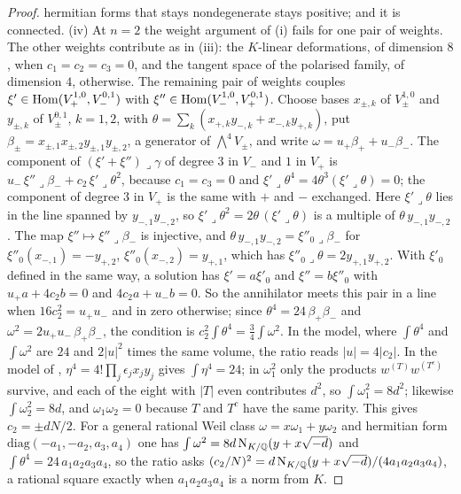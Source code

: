 \begin{proof}
hermitian forms that stays nondegenerate stays positive; and it is
connected. (iv) At $n=2$ the weight argument of
(i) fails for one pair of weights. The other weights
contribute as in (iii): the $K$-linear deformations, of dimension $8$, when
$c_{1}=c_{2}=c_{3}=0$, and the tangent space of the polarised family, of
dimension $4$, otherwise. The remaining pair of weights couples
$\xi'\in\operatorname{Hom}(V_{+}^{1,0},V_{-}^{0,1})$ with
$\xi''\in\operatorname{Hom}(V_{-}^{1,0},V_{+}^{0,1})$. Choose bases $x_{\pm,k}$ of
$V_{\pm}^{1,0}$ and $y_{\pm,k}$ of $V_{\pm}^{0,1}$, $k=1,2$, with
$\theta=\sum_{k}(x_{+,k}y_{-,k}+x_{-,k}y_{+,k})$, put
$\beta_{\pm}=x_{\pm,1}x_{\pm,2}y_{\pm,1}y_{\pm,2}$, a generator of
$\bigwedge^{4}V_{\pm}$, and write $\omega=u_{+}\beta_{+}+u_{-}\beta_{-}$. The component of
$(\xi'+\xi'')\lrcorner\gamma$ of degree $3$ in $V_{-}$ and $1$ in $V_{+}$ is
$u_{-}\,\xi''\lrcorner\beta_{-}+c_{2}\,\xi'\lrcorner\theta^{2}$, because
$c_{1}=c_{3}=0$ and $\xi'\lrcorner\theta^{4}=4\theta^{3}(\xi'\lrcorner\theta)=0$;
the component of degree $3$ in $V_{+}$ is the same with $+$ and $-$
exchanged.
Here $\xi'\lrcorner\theta$ lies in the line spanned by $y_{-,1}y_{-,2}$, so
$\xi'\lrcorner\theta^{2}=2\theta\,(\xi'\lrcorner\theta)$ is a multiple of
$\theta\,y_{-,1}y_{-,2}$. The map $\xi''\mapsto\xi''\lrcorner\beta_{-}$ is
injective, and $\theta\,y_{-,1}y_{-,2}=\xi''_{0}\lrcorner\beta_{-}$ for
$\xi''_{0}(x_{-,1})=-y_{+,2}$, $\xi''_{0}(x_{-,2})=y_{+,1}$, which has
$\xi''_{0}\lrcorner\theta=2y_{+,1}y_{+,2}$. With $\xi'_{0}$ defined in the
same way, a solution has $\xi'=a\xi'_{0}$ and $\xi''=b\xi''_{0}$ with
$u_{+}a+4c_{2}b=0$ and $4c_{2}a+u_{-}b=0$. So the annihilator meets this
pair in a line when $16c_{2}^{2}=u_{+}u_{-}$ and in zero otherwise; since
$\theta^{4}=24\,\beta_{+}\beta_{-}$ and
$\omega^{2}=2u_{+}u_{-}\,\beta_{+}\beta_{-}$, the condition is
$c_{2}^{2}\int\theta^{4}=\frac34\int\omega^{2}$.
In the model, where $\int\theta^{4}$ and $\int\omega^{2}$ are $24$ and
$2|u|^{2}$ times the same volume, the ratio reads $|u|=4|c_{2}|$. In the
model of \cite[Setup~4.1]{paperI}, $\eta^{4}=4!\prod_{j}\epsilon_{j}x_{j}y_{j}$
gives $\int\eta^{4}=24$; in $\omega_{1}^{2}$ only the products
$w^{(T)}w^{(T^{c})}$ survive, and each of the eight with $|T|$ even contributes
$d^{2}$, so $\int\omega_{1}^{2}=8d^{2}$; likewise $\int\omega_{2}^{2}=8d$, and
$\omega_{1}\omega_{2}=0$ because $T$ and $T^{c}$ have the same parity. This
gives $c_{2}=\pm dN/2$. For a general rational
Weil class $\omega=x\omega_{1}+y\omega_{2}$ and hermitian form
$\mathrm{diag}(-a_{1},-a_{2},a_{3},a_{4})$ one has
$\int\omega^{2}=8d\,\mathrm{N}_{K/\mathbb{Q}}(y+x\sqrt{-d})$ and
$\int\theta^{4}=24\,a_{1}a_{2}a_{3}a_{4}$, so the ratio asks
$(c_{2}/N)^{2}=d\,\mathrm{N}_{K/\mathbb{Q}}(y+x\sqrt{-d})/(4a_{1}a_{2}a_{3}a_{4})$, a rational
square exactly when $a_{1}a_{2}a_{3}a_{4}$ is a norm from $K$.
\end{proof}

